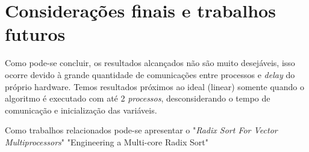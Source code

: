 \documentclass[journal]{IEEEtran}
\begin{document}
\section{Considerações finais e trabalhos futuros}
\label{chapter:conclusao}

Como pode-se concluir, os resultados alcançados não são muito desejáveis, isso ocorre devido à grande quantidade de comunicações entre processos e \textit{delay} do próprio hardware. Temos resultados próximos ao ideal (linear) somente quando o algoritmo é executado com até 2 \textit{processos}, desconsiderando o tempo de comunicação e inicialização das variáveis. 

Como trabalhos relacionados pode-se apresentar o "\textit{Radix Sort For Vector Multiprocessors}"\cite{radixForVectorMultiprocessors1991Zagha_Blelloch} "Engineering a Multi-core Radix Sort" \cite{wassenberg2011engineering}
 

\ifCLASSOPTIONcaptionsoff
  \newpage
\fi

\nocite{*}



 
\end{document}
